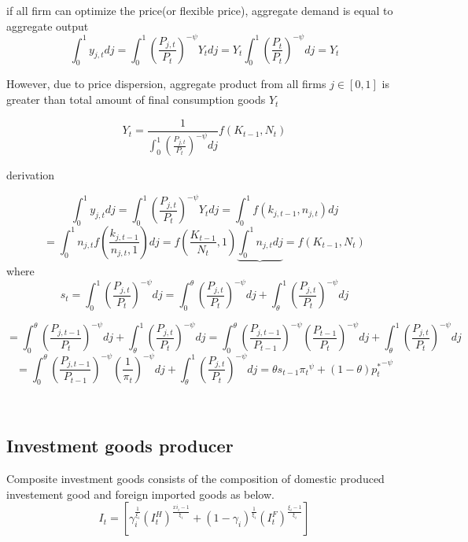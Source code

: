 \documentclass[11pt,titlepage]{article}
\begin{document}
if all firm can optimize the price(or flexible price), aggregate demand is equal to aggregate output\\
\begin{displaymath} 
\int_0^1 y_{j,t} dj = \int_0^1 \left(\frac{P_{j,t}}{P_t} \right)^{-\psi} Y_t dj = Y_t \int_0^1 \left(\frac{P_{t}}{P_t} \right)^{-\psi} dj = Y_t \end{displaymath}


 However, due to price dispersion, aggregate product from all firms $j \in [0,1]$ is greater than total amount of final consumption goods $Y_t$

\begin{displaymath} Y_t = \frac{1}{
\int_0^1 \left(\frac{P_{j,t}}{P_t} \right)^{-\psi} dj } f(K_{t-1}, N_t)
\end{displaymath}

derivation

 \begin{displaymath}
\int_0^1 y_{j,t} dj = \int_0^1 \left(\frac{P_{j,t}}{P_t} \right)^{-\psi} Y_t dj = \int_0^1 f(k_{j,t-1}, n_{j,t}) dj 
\end{displaymath}
\begin{displaymath}
= \int_0^1 n_{j,t} f \left(\frac{k_{j,t-1}}{n_{j,t}, 1} \right) dj = f \left(\frac{K_{t-1}}{N_{t}}, 1 \right) \underbrace{\int_0^1 n_{j,t}  dj}  = f(K_{t-1}, N_t) 
\end{displaymath}
where \[
s_t = \int_0^1 \left(\frac{P_{j,t}}{P_t} \right)^{-\psi} dj = \int_0^\theta \left(\frac{P_{j,t}}{P_t} \right)^{-\psi} dj + \int_\theta^1 \left(\frac{P_{j,t}}{P_t} \right)^{-\psi} dj 
\]

\[
= \int_0^\theta \left(\frac{P_{j,t-1}}{P_t} \right)^{-\psi} dj + \int_\theta^1 \left(\frac{P_{j,t}}{P_t} \right)^{-\psi} dj = \int_0^\theta \left(\frac{P_{j,t-1}}{P_{t-1}} \right)^{-\psi} \left(\frac{P_{t-1}}{P_{t}} \right)^{-\psi} dj + \int_\theta^1 \left(\frac{P_{j,t}}{P_t} \right)^{-\psi} dj 
\]
\[
= \int_0^\theta \left(\frac{P_{j,t-1}}{P_{t-1}} \right)^{-\psi} \left(\frac{1}{\pi_{t}} \right)^{-\psi} dj + \int_\theta^1 \left(\frac{P_{j,t}}{P_t} \right)^{-\psi} dj 
= \theta s_{t-1} {\pi_{t}}^{\psi}  + (1-\theta) {p_{t}^*} ^{-\psi} \]

~\\

\subsection {Investment goods producer} 
\normalsize
 Composite investment goods consists of the composition of domestic produced investement good and foreign imported goods as below.
\[I_t = \left[\gamma_i ^{\frac{1}{\xi_i}} (I_t^H )^{\frac{xi_i -1}{\xi_i}} +(1-\gamma_i) ^{\frac{1}{\xi_i}} (I_t^F )^{\frac{\xi_i -1}{\xi_i}}  \right] \]
\end{document}
